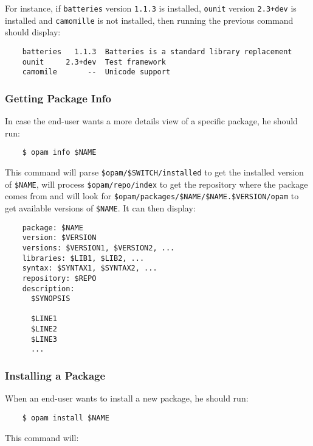 \documentclass[a4paper,10pt]{article}
\begin{document}
For instance, if {\tt batteries} version {\tt 1.1.3} is installed,
{\tt ounit} version {\tt 2.3+dev} is installed and {\tt camomille} is
not installed, then running the previous command should display:

\begin{verbatim}
    batteries   1.1.3  Batteries is a standard library replacement
    ounit     2.3+dev  Test framework
    camomile       --  Unicode support
\end{verbatim}

\subsubsection{Getting Package Info}

In case the end-user wants a more details view of a specific package,
he should run:

\begin{verbatim}
    $ opam info $NAME
\end{verbatim}

This command will parse \verb+$opam/$SWITCH/installed+ to get the
installed version of \verb+$NAME+, will process
\verb+$opam/repo/index+ to get the repository where the package comes
from and will look for \verb+$opam/packages/$NAME/$NAME.$VERSION/opam+
to get available versions of \verb+$NAME+. It can then display:

\begin{verbatim}
    package: $NAME
    version: $VERSION
    versions: $VERSION1, $VERSION2, ...
    libraries: $LIB1, $LIB2, ...
    syntax: $SYNTAX1, $SYNTAX2, ...
    repository: $REPO
    description:
      $SYNOPSIS

      $LINE1
      $LINE2
      $LINE3
      ...
\end{verbatim}

\subsubsection{Installing a Package}
\label{opam-install}

When an end-user wants to install a new package, he should run:

\begin{verbatim}
    $ opam install $NAME
\end{verbatim}

This command will:
\end{document}
